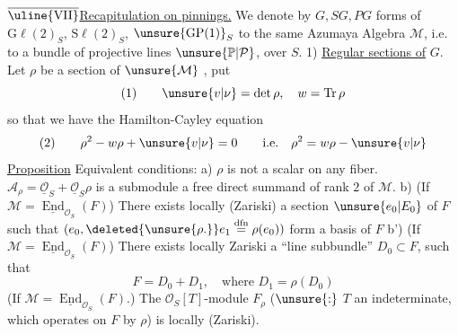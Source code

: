 $\overline{\text{\uline{VII}}}$\quad \uline{Recapitulation on pinnings.}
 We denote by $G,SG,PG$ forms of $\mathrm G\ell(2)_S$, $\mathrm S\ell(2)_S$, $\unsure{\mathrm{GP}(1)}_S$  to the same Azumaya Algebra $\mathcal M$, i.e. to a bundle of projective lines $\unsure{\mathbb P|\mathcal P}$, over $S$.
1) \uline{Regular sections of} $G$.
Let $\rho$ be a section of $\unsure{\mathcal M}$ , put
\[
(1)\qquad \unsure{v|\nu}=\det\rho,\quad w=\operatorname{Tr}\rho
\]
so that we have the Hamilton-Cayley equation
\[
(2)\qquad \rho^2-w\rho+\unsure{v|\nu}=0\qquad\text{i.e.}\quad\rho^2=w\rho-\unsure{v|\nu}
\]
\uline{Proposition} Equivalent conditions:
a) $\rho$ is not a scalar on any fiber.
 $\mathcal A_\rho=\underline{\mathcal O}_S+\underline{\mathcal O}_S\rho$ is a submodule  a free direct summand of rank $2$ of $\mathcal M$.
b) (If $\mathcal M=\underline{\operatorname{End}}_{\mathcal O_S}(F)$) There exists locally (Zariski) a section $\unsure{e_0|E_0}$ of $F$ such that $(e_0,\deleted{\unsure{\rho.}}e_1\mathrel{\overset{\mathrm{dfn}}{=}}\rho(e_0))$ form a basis of $F$
b') (If $\mathcal M=\underline{\operatorname{End}}_{\mathcal O_S}(F)$) There exists locally Zariski a ``line subbundle'' $D_0\subset F$, such that
\[
F=D_0+D_1,\quad\text{where }D_1=\rho(D_0)
\]
 (If $\mathcal M=\underline{\operatorname{End}}_{\mathcal O_S}(F)$.) The $\mathcal O_S[T]$-module $F_\rho$ ($\unsure{:}$ $T$  an indeterminate, which operates on $F$ by $\rho$) is   locally (Zariski).
